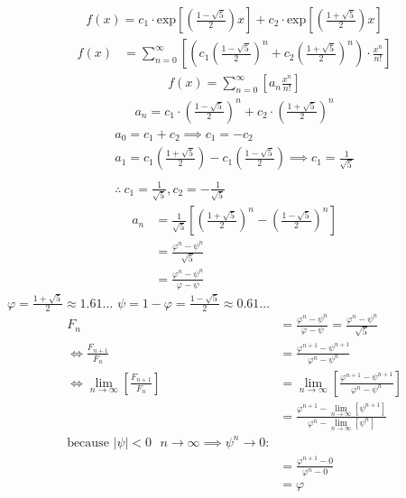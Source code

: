 \documentclass{article}
\begin{document}
\begin{align*}
f\left( x \right)= c_1 \cdot  \mathrm{exp}\left[ \left( \frac{1- \sqrt{5} }{2} \right)x \right] +  c_2 \cdot  \mathrm{exp}\left[ \left( \frac{1 +  \sqrt{5} }{2} \right)x \right]
\end{align*}
\begin{align*}
f\left( x \right)&= \sum^{\infty}_{n= 0}   \left[ \left( c_1\left( \frac{1- \sqrt{5} }{2} \right)^n +  c_2  \left( \frac{1+ \sqrt{5} }{2} \right)^n \right) \cdot  \frac{x^n}{n!} \right]
\end{align*}
\begin{align*}
f\left( x \right)= \sum^{\infty}_{n= 0}   \left[ a_n \frac{x^n}{n!} \right]
\end{align*}
\begin{align*}
a_n = c_1\cdot  \left( \frac{1- \sqrt{5} }{2} \right)^n +  c_2 \cdot  \left( \frac{1+  \sqrt{5} }{2} \right)^n
\end{align*}
\begin{align*}
a_0= c_1 +  c_2  \implies  c_1= - c_2\\
a_1= c_1 \left( \frac{1+ \sqrt{5} }{2} \right) -  c_1 \left( \frac{1-\sqrt{5} }{2} \right)  \implies  c_1 = \frac{1}{\sqrt{5} }\\
\ \\
\therefore ~ c_1 = \frac{1}{\sqrt{5}}, c_2 = -\frac{1}{\sqrt{5}}
\end{align*}
\begin{align}
    a_n &= \frac{1}{\sqrt{5} } \left[ \left( \frac{1+  \sqrt{5} }{2}  \right)^n -  \left( \frac{1- \sqrt{5} }{2} \right)^n \right] \nonumber \\
&= \frac{\varphi^n - \psi^n}{\sqrt{5} } \nonumber\\
&=\frac{\varphi^n -  \psi^n}{\varphi - \psi} \label{eq:fib-sol}
\end{align}
$\varphi = \frac{1+ \sqrt{5} }{2} \approx 1.61\ldots$
$\psi = 1-\varphi = \frac{1- \sqrt{5} }{2} \approx 0.61\ldots$
\begin{align*}
    F_n &= \frac{\varphi^n-\psi^n}{\varphi-\psi} = \frac{\varphi^n-\psi^n}{\sqrt 5} \\
    \iff \frac{F_{n+1}}{F_n}	&= \frac{\varphi^{n+ 1} - \psi^{n+  1}}{\varphi^{n} - \psi^{n}} \\
    \iff \lim_{n \rightarrow \infty}\left[ \frac{F_{n+1}}{F_n} \right]	&= \lim_{n \rightarrow \infty}\left[ \frac{\varphi^{n+ 1} - \psi^{n+  1}}{\varphi^{n} - \psi^{n}} \right] \\
&= \frac{\varphi^{n+ 1} -\lim_{n \rightarrow \infty}\left[ \psi^{n +  1} \right] }{\varphi^{n} - \lim_{n \rightarrow \infty}\left[ \psi^n \right] } \\
\text{because $\mid \psi \mid < 0$ $n \rightarrow \infty \implies \psi^{n} \rightarrow 0$:} \\
&= \frac{\varphi^{n+  1} -  0}{\varphi^{n} -  0} \\
&= \varphi
\end{align*}
\end{document}
